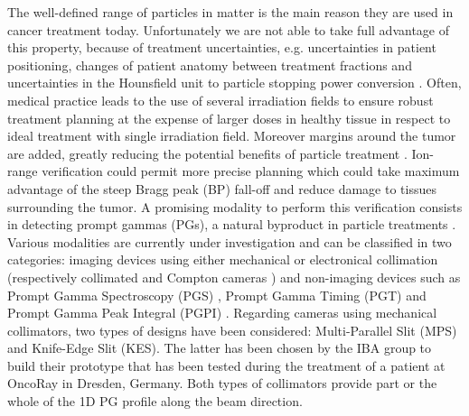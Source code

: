 \documentclass[a4paper,english,12pt]{article}
\begin{document}
The well-defined range of particles in matter is the main reason they are used in cancer treatment today. Unfortunately we are not able to take full advantage of this property, because of treatment uncertainties, e.g. uncertainties in patient positioning, changes of patient anatomy between treatment fractions and uncertainties in the Hounsfield unit to particle stopping power conversion \citep{Paganetti2012}. Often, medical practice leads to the use of several irradiation fields to ensure robust treatment planning at the expense of larger doses in healthy tissue in respect to ideal treatment with single irradiation field. Moreover margins around the tumor are added, greatly reducing the potential benefits of particle treatment \citep{Knopf2013}. Ion-range verification could permit more precise planning which could take maximum advantage of the steep Bragg peak (BP) fall-off and reduce damage to tissues surrounding the tumor. A promising modality to perform this verification consists in detecting prompt gammas (PGs), a natural byproduct in particle treatments \citep{Krimmer2017a, Parodi2018}. Various modalities are currently under investigation and can be classified in two categories: imaging devices using either mechanical or electronical collimation (respectively collimated \citep{Perali2014, Min2012, Pinto2014a} and Compton cameras \citep{Krimmer2015,Kurosawa2012,Thirolf2016,Polf2015,Llosa2016}) and non-imaging devices such as Prompt Gamma Spectroscopy (PGS) \citep{Hueso-Gonzalez2016}, Prompt Gamma Timing (PGT) \citep{Pausch2016} and Prompt Gamma Peak Integral (PGPI) \citep{Krimmer2017}. Regarding cameras using mechanical collimators, two types of designs have been considered: Multi-Parallel Slit (MPS) and Knife-Edge Slit (KES). The latter has been chosen by the IBA group to build their prototype that has been tested during the treatment of a patient at OncoRay in Dresden, Germany. Both types of collimators provide part or the whole of the 1D PG profile along the beam direction.
\end{document}
